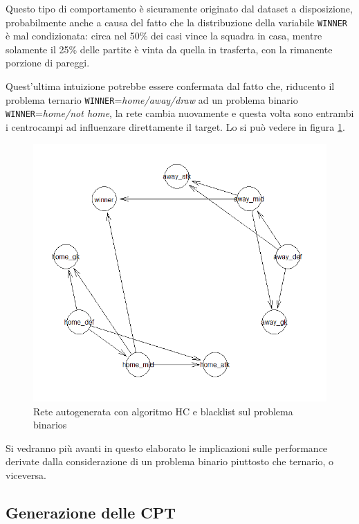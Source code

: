 \documentclass[hidelinks, 12pt]{article}
\begin{document}
Questo tipo di comportamento è sicuramente originato dal dataset a disposizione, probabilmente anche a causa del fatto che la distribuzione della variabile \texttt{WINNER} è mal condizionata: circa nel 50\% dei casi vince la squadra in casa, mentre solamente il 25\% delle partite è vinta da quella in trasferta, con la rimanente porzione di pareggi.

Quest'ultima intuizione potrebbe essere confermata dal fatto che, riducento il problema ternario \texttt{WINNER}=\textit{home/away/draw} ad un problema binario \texttt{WINNER}=\textit{home/not home}, la rete cambia nuovamente e questa volta sono entrambi i centrocampi ad influenzare direttamente il target. Lo si può vedere in figura \ref{img:hc-bin-bl}.

\begin{figure}[H]
	\centering
	\includegraphics[scale=0.75]{images/05_02_hc_bin_bl.png}
	\caption[Rete autogenerata con algoritmo HC e blacklist sul problema binario]{Rete autogenerata con algoritmo HC e blacklist sul problema binarios}
	\label{img:hc-bin-bl}
\end{figure}

Si vedranno più avanti in questo elaborato le implicazioni sulle performance derivate dalla considerazione di un problema binario piuttosto che ternario, o viceversa.


\subsection{Generazione delle CPT}
\end{document}
